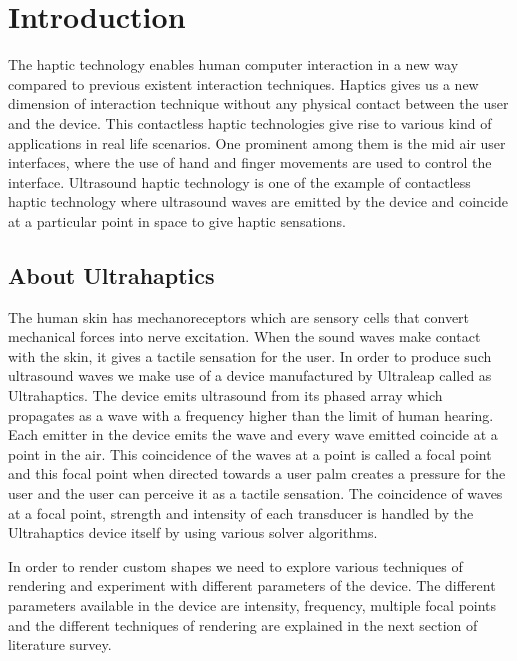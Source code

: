 %
\chapter{Introduction}
\label{sec:intro}

The haptic technology enables human computer interaction in a new way compared to previous existent interaction techniques. Haptics gives us a new dimension of interaction technique without any physical contact between the user and the device. This contactless haptic technologies give rise to various kind of applications in real life scenarios. One prominent among them is the mid air user interfaces, where the use of hand and finger movements are used to control the interface. Ultrasound haptic technology \cite{iwamoto2008non} is one of the example of contactless haptic technology where ultrasound waves are emitted by the device and coincide at a particular point in space to give haptic sensations. 

\section{About Ultrahaptics}
\label{sec:intro:about ultrahaptics}

The human skin has mechanoreceptors which are sensory cells that convert mechanical forces into nerve excitation. When the sound waves make contact with the skin, it gives a tactile sensation for the user. In order to produce such ultrasound waves we make use of a device manufactured by Ultraleap \cite{ul} called as Ultrahaptics.	The device emits ultrasound from its phased array which propagates as a wave with a frequency higher than the limit of human hearing. Each emitter in the device emits the wave and every wave emitted coincide at a point in the air. This coincidence of the waves at a point is called a focal point and this focal point when directed towards a user palm creates a pressure for the user and the user can perceive it as a tactile sensation. The coincidence of waves at a focal point, strength and intensity of each transducer is handled by the Ultrahaptics device itself by using various solver algorithms.

In order to render custom shapes we need to explore various techniques of rendering and experiment with different parameters of the device. The different parameters available in the device are intensity, frequency, multiple focal points and the different techniques of rendering are explained in the next section of literature survey. 

